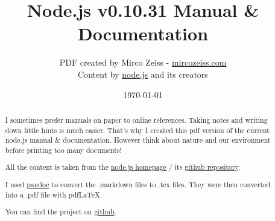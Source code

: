 \documentclass[10pt, a4paper, titlepage, oneside, plain]{article}
\begin{document}
	\title{Node.js v0.10.31 Manual \& Documentation}
	\author{PDF created by Mirco Zeiss - \href{http://mircozeiss.com}{mircozeiss.com}\\Content by \href{http://www.nodejs.org}{node.js} and its creators}
	\date{\today}

	\maketitle

	\begin{abstract}
	I sometimes prefer manuals on paper to online references. Taking notes and writing down little hints is much easier. That's why I created this pdf version of the current node.js manual \& documentation. However think about nature and our environment before printing too many documents!

	All the content is taken from the \href{http://www.nodejs.org}{node.js homepage} / its \href{https://github.com/joyent/node}{github repository}.

	I used \href{http://johnmacfarlane.net/pandoc/}{pandoc} to convert the .markdown files to .tex files. They were then converted into a .pdf file with pdfLaTeX.

	You can find the project on \href{https://github.com/zeMirco/nodejs-pdf-docs}{github}.
	\end{abstract}

	\tableofcontents

	
	
	
	
	
	
	
					
	
	
	
	
	
				
	
	
	
	
	
	
	
	
	
	
	
	
\end{document}
